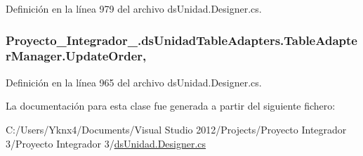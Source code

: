 Definición en la línea 979 del archivo ds\-Unidad.\-Designer.\-cs.

\hypertarget{class_proyecto___integrador__3_1_1ds_unidad_table_adapters_1_1_table_adapter_manager_a002d41398871750c340bb6bf45a14e16}{
\subsubsection[{Update\-Order}]{ Proyecto\-\_\-\-Integrador\-\_.\-ds\-Unidad\-Table\-Adapters.\-Table\-Adapter\-Manager.\-Update\-Order\hspace{0.3cm}{\ttfamily [get]}, {\ttfamily [set]}}}\label{class_proyecto___integrador__3_1_1ds_unidad_table_adapters_1_1_table_adapter_manager_a002d41398871750c340bb6bf45a14e16}


Definición en la línea 965 del archivo ds\-Unidad.\-Designer.\-cs.



La documentación para esta clase fue generada a partir del siguiente fichero\-:\begin{DoxyCompactItemize}
\item 
C\-:/\-Users/\-Yknx4/\-Documents/\-Visual Studio 2012/\-Projects/\-Proyecto Integrador 3/\-Proyecto Integrador 3/\hyperlink{ds_unidad_8_designer_8cs}{ds\-Unidad.\-Designer.\-cs}\end{DoxyCompactItemize}
